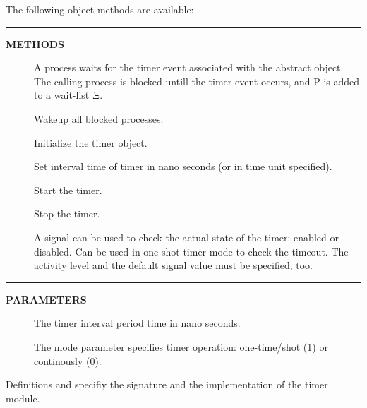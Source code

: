 \documentclass[a4paper,12pt,twoside,english]{article}
\begin{document}
\vskip5pt
The following object methods are available:


\vskip5pt
\vskip5pt\color{highlight-color}
{\rule[-1pt]{2em}{1em}\hskip15pt\bf METHODS

}
\color{black}

\begin{description}
\item[] $ $\\
A process waits for the timer event associated with the abstract object.  The calling process is blocked untill the timer event occurs, and P is added to a
wait-list $\Xi$.

\item[] $ $\\
Wakeup all blocked processes.

\item[] $ $\\
Initialize the timer object.

\item[] $ $\\
Set interval time of timer in nano seconds (or in time unit specified). 

\item[] $ $\\
Start the timer.

\item[] $ $\\
Stop the timer.

\item[] $ $\\
A signal can be used to check the actual state of the timer: enabled or disabled. Can be used in one-shot timer mode to check the timeout. The activity level
and the default signal value must be specified, too.


\end{description}
\vskip5pt\color{highlight-color}
{\rule[-1pt]{2em}{1em}\hskip15pt\bf PARAMETERS

}
\color{black}

\begin{description}
\item[] $ $\\
The timer interval period time in nano seconds.

\item[] $ $\\
The mode parameter specifies timer operation: one-time/shot (1) or continously (0).


\end{description}
Definitions  and  specifiy the signature and the implementation of the timer module. 
\end{document}

